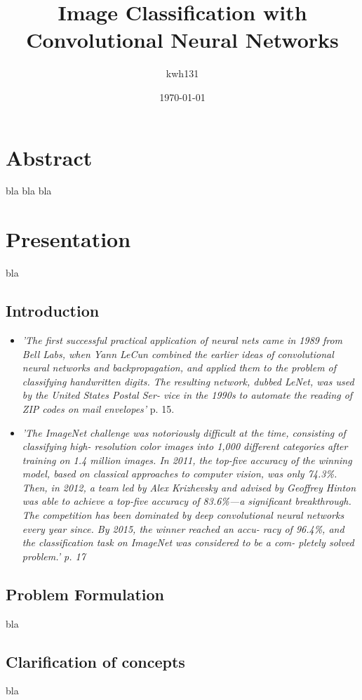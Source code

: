 \documentclass[a4paper,11pt]{article}
\title{Image Classification with Convolutional Neural Networks}
\author{kwh131}
\date{\today}
\begin{document}
	
\maketitle

\section{Abstract}
bla bla bla

\tableofcontents

\newpage

\section{Presentation}
bla
\subsection{Introduction}
\begin{itemize}
	\item \textit{'The first successful practical application of neural nets came in 1989 from Bell
	Labs, when Yann LeCun combined the earlier ideas of convolutional neural networks
	and backpropagation, and applied them to the problem of classifying handwritten
	digits. The resulting network, dubbed LeNet, was used by the United States Postal Ser-
	vice in the 1990s to automate the reading of ZIP codes on mail envelopes'} \cite{Chollet-et-al-2018} p. 15.
	\item \textit{'The
		ImageNet challenge was notoriously difficult at the time, consisting of classifying high-
		resolution color images into 1,000 different categories after training on 1.4 million
		images. In 2011, the top-five accuracy of the winning model, based on classical
		approaches to computer vision, was only 74.3\%. Then, in 2012, a team led by Alex
		Krizhevsky and advised by Geoffrey Hinton was able to achieve a top-five accuracy of
		83.6\%—a significant breakthrough. The competition has been dominated by deep
		convolutional neural networks every year since. By 2015, the winner reached an accu-
		racy of 96.4\%, and the classification task on ImageNet was considered to be a com-
		pletely solved problem.' \cite{Chollet-et-al-2018} p. 17}
\end{itemize}
\subsection{Problem Formulation}
bla
\subsection{Clarification of concepts}
bla
\end{document}
